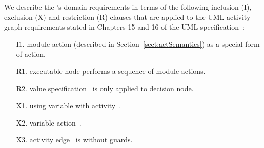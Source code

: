 We describe the \agl's domain requirements in terms of the following inclusion (I), exclusion (X) and restriction (R) clauses that are applied to the UML activity graph requirements stated in Chapters 15 and 16 of the UML specification~\cite{omg_unified_2015}:

\begin{itemize}%
	\item[I1.] module action (described in Section~\ref{sect:actSemantics}) as a special form of action.
	\item[R1.] executable node performs a sequence of module actions.
	\item[R2.] value specification~\cite[pg~\footnote{we use~'pg'~ to denote Page in the interpreted from the context }.~376]{omg_unified_2015} is only applied to decision node.
	\item[X1.] using variable with activity~\cite[pg.~377]{omg_unified_2015}.
	\item[X2.] variable action~\cite[pg.~470]{omg_unified_2015}.
  \item[X3.] activity edge~\cite[pg.~375]{omg_unified_2015} is without guards.
\end{itemize}

